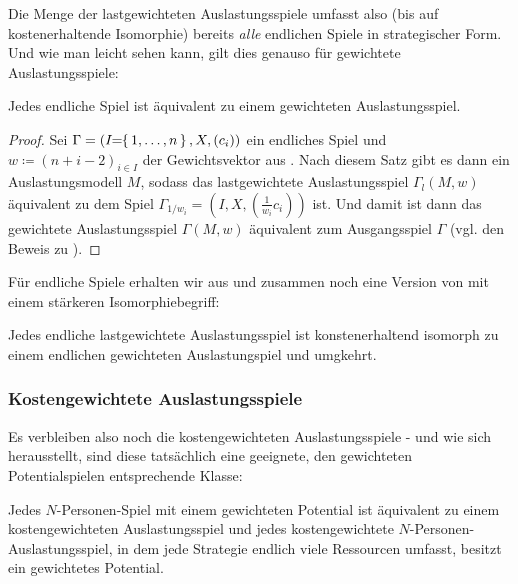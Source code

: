 Die Menge der lastgewichteten Auslastungsspiele umfasst also (bis auf kostenerhaltende Isomorphie) bereits \emph{alle} endlichen Spiele in strategischer Form. Und wie man leicht sehen kann, gilt dies genauso für gewichtete Auslastungsspiele:

\begin{kor}\label{kor:JedesSpielGewAusl}
	Jedes endliche Spiel ist äquivalent zu einem gewichteten Auslastungsspiel.
\end{kor}

\begin{proof}
	Sei $\Gamma = (I\!\!=\!\!\set{1, \dots, n}, X, (c_i))$ ein endliches Spiel und $w \coloneqq (n+i-2)_{i \in I}$ der Gewichtsvektor aus . Nach diesem Satz gibt es dann ein Auslastungsmodell $M$, sodass das lastgewichtete Auslastungsspiel $\Gamma_l(M, w)$ äquivalent zu dem Spiel $\Gamma_{1/w_i} = (I, X, (\frac{1}{w_i}c_i))$ ist. Und damit ist dann das gewichtete Auslastungsspiel $\Gamma(M, w)$ äquivalent zum Ausgangsspiel $\Gamma$ (vgl. den Beweis zu ). 
\end{proof}

Für endliche Spiele erhalten wir aus  und  zusammen noch eine Version von  mit einem stärkeren Isomorphiebegriff:

\begin{kor}\label{kor:endlLastGewAuslIsomGewAusl}
	Jedes endliche lastgewichtete Auslastungsspiel ist konstenerhaltend isomorph zu einem endlichen gewichteten Auslastungspiel und umgkehrt.
\end{kor}


\subsubsection{Kostengewichtete Auslastungsspiele}

Es verbleiben also noch die kostengewichteten Auslastungsspiele - und wie sich herausstellt, sind diese tatsächlich eine geeignete, den gewichteten Potentialspielen entsprechende Klasse:

\begin{satz}\label{satz:MondererShapleyKostengew}
	Jedes $N$-Personen-Spiel mit einem gewichteten Potential ist äquivalent zu einem kostengewichteten Auslastungsspiel und jedes kostengewichtete $N$-Personen-Auslastungsspiel, in dem jede Strategie endlich viele Ressourcen umfasst, besitzt ein gewichtetes Potential.
\end{satz}

